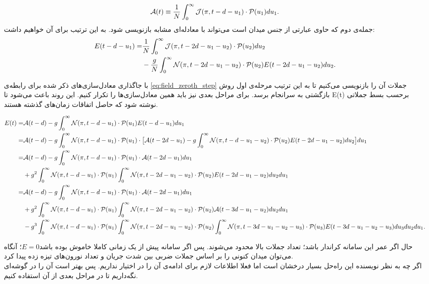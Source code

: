 \begin{equation}
	\mathcal{A}(t) \equiv \frac{1}{N}\int_{0}^{\infty} \mathcal{J}(\pi,t-d-u_1) \cdot \mathcal{P}(u_{1}) du_1 .
\end{equation}
 جمله‌ی دوم که حاوی عبارتی از جنس میدان است می‌تواند با معادله‌ای مشابه بازنویسی شود. به این ترتیب برای آن خواهیم داشت:
\begin{align}
	E(t - d - u_1) =& \frac{1}{N} \int_{0}^{\infty} \mathcal{J}(\pi,t-2d-u_1-u_2) \cdot \mathcal{P}(u_{2}) du_2\\
	&- \frac{g}{N}\int_{0}^{\infty} \mathcal{N}(\pi, t-2d-u_1-u_2) \cdot \mathcal{P}(u_{2}) E(t-2d-u_1-u_2)  du_2 .
\end{align}

\begin{landscape}
با جاگذاری معادل‌سازی‌های ذکر شده برای رابطه‌ی
\ref{eq:field_zeroth_step}
جملات آن را بازنویسی می‌کنیم تا به این ترتیب مرحله‌ی اول روش بازگشتی به سرانجام برسد. برای مراحل بعدی نیز باید همین معادل‌سازی‌ها را تکرار کنیم. این روند باعث می‌شود تا 
E(t)
برحسب بسط جملاتی نوشته شود که حاصل اتفاقات زمان‌های گذشته هستند.

	\begin{align}
		E(t) =& \mathcal{A}(t-d) - g\int_{0}^{\infty} \mathcal{N}(\pi, t-d-u_1) \cdot \mathcal{P}(u_{1}) E(t-d-u_1) du_1\\
		=& \mathcal{A}(t-d) - g\int_{0}^{\infty} \mathcal{N}(\pi, t-d-u_1) \cdot \mathcal{P}(u_{1}) \cdot \big[ \mathcal{A}(t-2d-u_1) - g\int_{0}^{\infty} \mathcal{N}(\pi, t-d- u_1-u_2) \cdot \mathcal{P}(u_{2}) E(t-2d-u_1-u_2) du_2 \big] du_1\\
		=& \mathcal{A}(t-d) - g\int_{0}^{\infty} \mathcal{N}(\pi, t-d-u_1) \cdot \mathcal{P}(u_{1}) \cdot \mathcal{A}(t-2d-u_1) du_1\\ 
		&+ g^2 \int_{0}^{\infty} \mathcal{N}(\pi, t-d-u_1) \cdot \mathcal{P}(u_{1})\int_{0}^{\infty} \mathcal{N}(\pi, t-2d-u_1-u_2) \cdot \mathcal{P}(u_{2}) E(t-2d-u_1-u_2) du_2 du_1\\
		=& \mathcal{A}(t-d) - g\int_{0}^{\infty} \mathcal{N}(\pi, t-d-u_1) \cdot \mathcal{P}(u_{1}) \cdot \mathcal{A}(t-2d-u_1) du_1\\ 
		&+ g^2 \int_{0}^{\infty} \mathcal{N}(\pi, t-d-u_1) \cdot \mathcal{P}(u_{1})\int_{0}^{\infty} \mathcal{N}(\pi, t-2d-u_1-u_2) \cdot \mathcal{P}(u_{2}) \mathcal{A}(t-3d-u_1-u_2) du_2 du_1\\
		&- g^3 \int_{0}^{\infty} \mathcal{N}(\pi, t-d-u_1) \cdot \mathcal{P}(u_{1})\int_{0}^{\infty} \mathcal{N}(\pi, t-2d-u_1-u_2) \cdot \mathcal{P}(u_{2}) \int_{0}^{\infty} \mathcal{N}(\pi, t-3d-u_1-u_2-u_3) \cdot \mathcal{P}(u_{3}) E(t-3d-u_1-u_2-u_3) du_3 du_2 du_1 .
	\end{align}
\end{landscape}

\restoregeometry 

حال اگر عمر این سامانه کراندار باشد؛ تعداد جملات بالا محدود می‌شوند. پس اگر سامانه پیش از یک زمانی کاملا خاموش بوده باشد$E = 0$؛ آنگاه می‌توان میدان کنونی را بر اساس جملات ضربی بین شدت جریان و تعداد نورون‌های تیزه زده پیدا کرد.\\
اگر چه به نظر نویسنده این راه‌حل بسیار درخشان است اما فعلا اطلاعات لازم برای ادامه‌ی آن را در اختیار نداریم. پس بهتر است آن را در گوشه‌ای نگه‌داریم تا در مراحل بعدی از آن استفاده کنیم.


